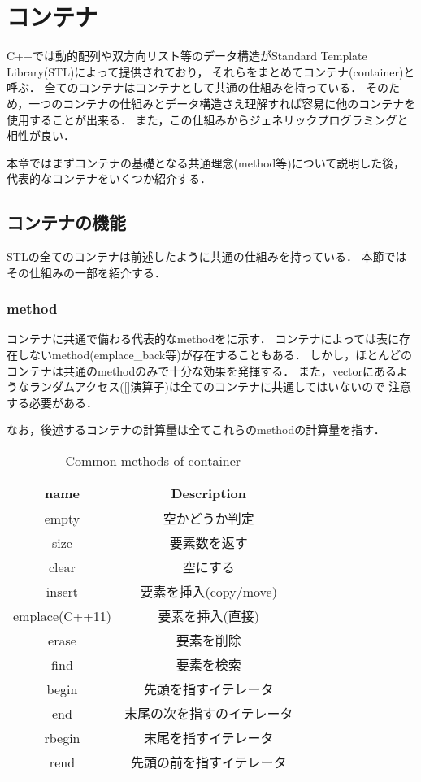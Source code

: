 \section{コンテナ}
C++では動的配列や双方向リスト等のデータ構造がStandard Template Library(STL)によって提供されており，
それらをまとめてコンテナ(container)と呼ぶ．
全てのコンテナはコンテナとして共通の仕組みを持っている．
そのため，一つのコンテナの仕組みとデータ構造さえ理解すれば容易に他のコンテナを使用することが出来る．
また，この仕組みからジェネリックプログラミングと相性が良い．

本章ではまずコンテナの基礎となる共通理念(method等)について説明した後，
代表的なコンテナをいくつか紹介する．

\subsection{コンテナの機能}
STLの全てのコンテナは前述したように共通の仕組みを持っている．
本節ではその仕組みの一部を紹介する．

\subsubsection{method}
コンテナに共通で備わる代表的なmethodをに示す．
コンテナによっては表に存在しないmethod(emplace\_back等)が存在することもある．
しかし，ほとんどのコンテナは共通のmethodのみで十分な効果を発揮する．
また，vectorにあるようなランダムアクセス([]演算子)は全てのコンテナに共通してはいないので
注意する必要がある．

なお，後述するコンテナの計算量は全てこれらのmethodの計算量を指す．
\begin{table}[htbp]
    \caption{Common methods of container}
    \label{tb:container_method}
    \begin{center}
    \begin{tabular}{cc} \hline
        name & Description \\ \hline \hline
        empty & 空かどうか判定 \\ \hline
        size & 要素数を返す \\ \hline
        clear & 空にする \\ \hline
        insert & 要素を挿入(copy/move) \\ \hline
        emplace(C++11) & 要素を挿入(直接) \\ \hline
        erase & 要素を削除 \\ \hline
        find & 要素を検索 \\ \hline
        begin & 先頭を指すイテレータ \\ \hline
        end & 末尾の次を指すのイテレータ \\ \hline
        rbegin & 末尾を指すイテレータ \\ \hline
        rend & 先頭の前を指すイテレータ \\ \hline
    \end{tabular}
    \end{center}
\end{table}

